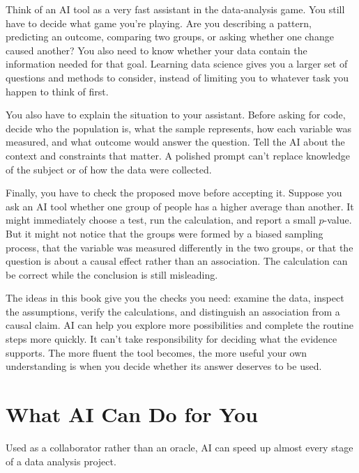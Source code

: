 Think of an AI tool as a very fast assistant in the data-analysis game. You
still have to decide what game you're playing. Are you describing a pattern,
predicting an outcome, comparing two groups, or asking whether one change
caused another? You also need to know whether your data contain the information
needed for that goal. Learning data science gives you a larger set of
questions and methods to consider, instead of limiting you to whatever task
you happen to think of first.

You also have to explain the situation to your assistant. Before asking for
code, decide who the population is, what the sample represents, how each
variable was measured, and what outcome would answer the question. Tell the AI
about the context and constraints that matter. A polished prompt can't replace
knowledge of the subject or of how the data were collected.

Finally, you have to check the proposed move before accepting it. Suppose you
ask an AI tool whether one group of people has a higher average than another.
It might immediately choose a test, run the calculation, and report a small
$p$-value. But it might not notice that the groups were formed by a biased
sampling process, that the variable was measured differently in the two
groups, or that the question is about a causal effect rather than an
association. The calculation can be correct while the conclusion is still
misleading.

The ideas in this book give you the checks you need: examine the data, inspect
the assumptions, verify the calculations, and distinguish an association from
a causal claim. AI can help you explore more possibilities and complete the
routine steps more quickly. It can't take responsibility for deciding what
the evidence supports. The more fluent the tool becomes, the more useful your
own understanding is when you decide whether its answer deserves to be used.

\section{What AI Can Do for You}

Used as a collaborator rather than an oracle, AI can
speed up almost every stage of a data analysis project.

